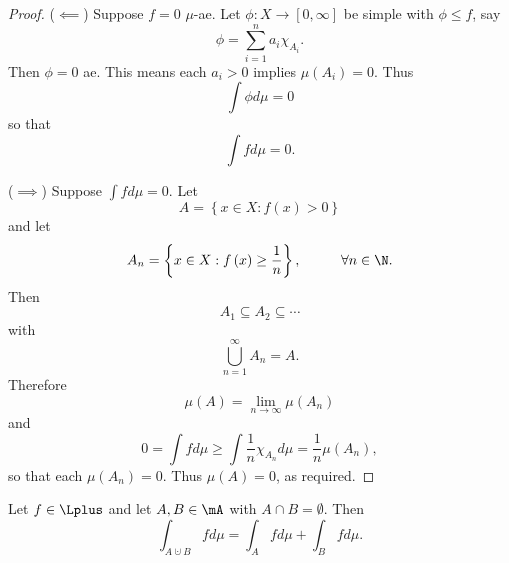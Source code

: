 \documentclass[pmath451]{subfiles}
\begin{document}
    \begin{proof}
        ($\impliedby$) Suppose $f=0$ $\mu$-ae. Let $\phi:X\to\left[ 0,\infty \right]$ be simple with $\phi\leq f$, say
        \begin{equation*}
            \phi = \sum^{n}_{i=1}a_i\chi_{A_i}.
        \end{equation*}
        Then $\phi=0$ ae. This means each $a_i>0$ implies $\mu\left( A_i \right)=0$. Thus
        \begin{equation*}
            \int\phi d\mu = 0
        \end{equation*}
        so that
        \begin{equation*}
            \int fd\mu = 0.
        \end{equation*}

        ($\implies$) Suppose $\int fd\mu = 0$. Let
        \begin{equation*}
            A = \left\lbrace x\in X: f\left( x \right)>0 \right\rbrace
        \end{equation*}
        and let
        \begin{equation*}
            A_n = \left\lbrace x\in X: f\left( x \right)\geq \frac{1}{n} \right\rbrace,\hspace{1cm}\forall n\in\N.
        \end{equation*}
        Then
        \begin{equation*}
            A_1\subseteq A_2\subseteq\cdots
        \end{equation*}
        with
        \begin{equation*}
            \bigcup^{\infty}_{n=1}A_n = A.
        \end{equation*}
        Therefore
        \begin{equation*}
            \mu\left( A \right) = \lim_{n\to\infty}\mu\left( A_n \right)
        \end{equation*}
        and
        \begin{equation*}
            0 = \int fd\mu \geq \int \frac{1}{n}\chi_{A_n}d\mu = \frac{1}{n}\mu\left( A_n \right),
        \end{equation*}
        so that each $\mu\left( A_n \right) = 0$. Thus $\mu\left( A \right) = 0$, as required.
    \end{proof}

    \begin{prop}{}
        Let $f\in\Lplus$ and let $A,B\in\mA$ with $A\cap B = \emptyset$. Then
        \begin{equation*}
            \int_{A\cupdot B} f d\mu = \int_Afd\mu + \int_Bfd\mu.
        \end{equation*}
    \end{prop}
    
\end{document}
